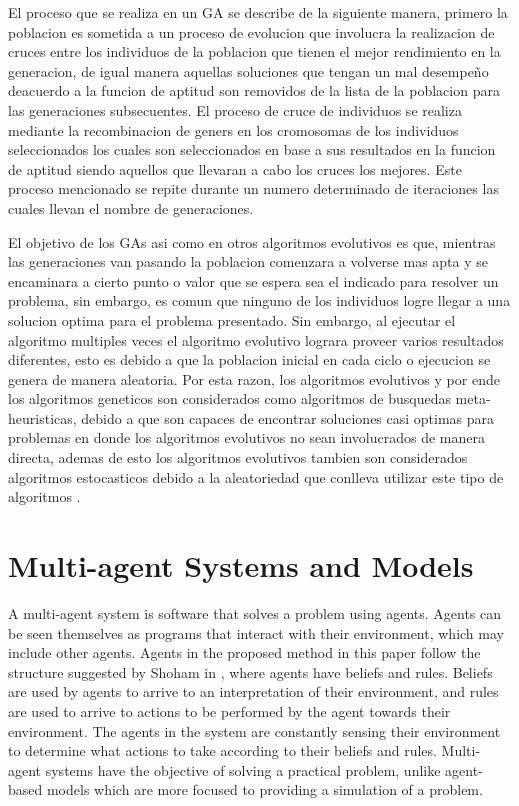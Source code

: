 El proceso que se realiza en un GA se describe de la siguiente manera, primero
la poblacion es sometida a un proceso de evolucion que involucra la realizacion
de cruces entre los individuos de la poblacion que tienen el mejor rendimiento
en la generacion, de igual manera aquellas soluciones que tengan un mal
desempeño deacuerdo a la funcion de aptitud son removidos de la lista de la
poblacion para las generaciones subsecuentes. El proceso de cruce de individuos
se realiza mediante la recombinacion de geners en los cromosomas de los
individuos seleccionados los cuales son seleccionados en base a sus resultados
en la funcion de aptitud siendo aquellos que llevaran a cabo los cruces los
mejores. Este proceso mencionado se repite durante un numero determinado de
iteraciones las cuales llevan el nombre de generaciones.

El objetivo de los GAs asi como en otros algoritmos evolutivos es que, mientras
las generaciones van pasando la poblacion comenzara a volverse mas apta y se
encaminara a cierto punto o valor que se espera sea el indicado para resolver un
problema, sin embargo, es comun que ninguno de los individuos logre llegar a una
solucion optima para el problema presentado. Sin embargo, al ejecutar el
algoritmo multiples veces el algoritmo evolutivo lograra proveer varios
resultados diferentes, esto es debido a que la poblacion inicial en cada ciclo o
ejecucion se genera de manera aleatoria. Por esta razon, los algoritmos
evolutivos y por ende los algoritmos geneticos son considerados como algoritmos
de busquedas meta-heuristicas, debido a que son capaces de encontrar soluciones
casi optimas para problemas en donde los algoritmos evolutivos no sean
involucrados de manera directa, ademas de esto los algoritmos evolutivos tambien
son considerados algoritmos estocasticos debido a la aleatoriedad que conlleva
utilizar este tipo de algoritmos \cite{Harik1999}.

\section{Multi-agent Systems and Models}
\label{section:multi-agent-systems-and-models}

A multi-agent system is software that solves a problem using agents. Agents can
be seen themselves as programs that interact with their environment, which may
include other agents. Agents in the proposed method in this paper follow the
structure suggested by Shoham in \cite{Shoham1993}, where agents have beliefs
and rules. Beliefs are used by agents to arrive to an interpretation of their
environment, and rules are used to arrive to actions to be performed by the
agent towards their environment. The agents in the system are constantly sensing
their environment to determine what actions to take according to their beliefs
and rules. Multi-agent systems have the objective of solving a practical
problem, unlike agent-based models which are more focused to providing a
simulation of a problem.

